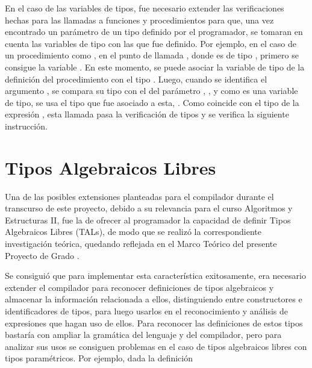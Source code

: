 {{En el caso de las variables de tipos, fue necesario extender las verificaciones
hechas para las llamadas a funciones y procedimientos para que, una vez
encontrado un parámetro de un tipo definido por el programador, se tomaran en
cuenta las variables de tipo con las que fue definido. Por ejemplo, en el caso
de un procedimiento como , en el punto
de llamada , donde  es de tipo
, primero se consigue la variable . En este
momento, se puede asociar la variable de tipo  de la definición del
procedimiento  con el tipo . Luego, cuando se
identifica el argumento , se compara su tipo con el del parámetro
, , y como es una variable de tipo, se usa el tipo que fue
asociado a esta, . Como coincide con el tipo de la expresión
, esta llamada pasa la verificación de tipos y se verifica la
siguiente instrucción.

\section{Tipos Algebraicos Libres}

Una de las posibles extensiones planteadas para el compilador durante el
transcurso de este proyecto, debido a su relevancia para el curso Algoritmos y
Estructuras II, fue la de ofrecer al programador la capacidad de definir Tipos
Algebraicos Libres (TALs), de modo que se realizó la correspondiente investigación
teórica, quedando reflejada en el Marco Teórico del presente Proyecto de Grado
.

Se consiguió que para implementar esta característica exitosamente, era
necesario extender el compilador para reconocer definiciones de tipos
algebraicos y almacenar la información relacionada a ellos, distinguiendo entre
constructores e identificadores de tipos, para luego usarlos en el
reconocimiento y análisis de expresiones que hagan uso de ellos. Para reconocer
las definiciones de estos tipos bastaría con ampliar la gramática del lenguaje y
del compilador, pero para analizar sus usos se consiguen problemas en el caso de
tipos algebraicos libres con tipos paramétricos. Por ejemplo, dada la definición

}}
